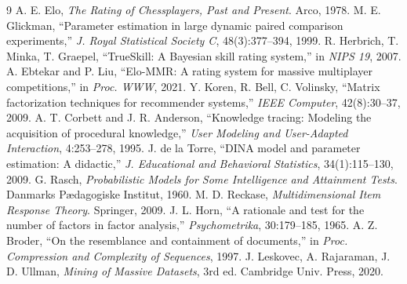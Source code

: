 \documentclass[conference]{IEEEtran}
\begin{document}
\begin{thebibliography}{9}
\scriptsize
\setlength{\itemsep}{0pt}
 A. E. Elo, \emph{The Rating of Chessplayers, Past and Present}. Arco, 1978.
 M. E. Glickman, ``Parameter estimation in large dynamic paired comparison experiments,'' \emph{J. Royal Statistical Society C}, 48(3):377--394, 1999.
 R. Herbrich, T. Minka, T. Graepel, ``TrueSkill: A Bayesian skill rating system,'' in \emph{NIPS 19}, 2007.
 A. Ebtekar and P. Liu, ``Elo-MMR: A rating system for massive multiplayer competitions,'' in \emph{Proc. WWW}, 2021.
 Y. Koren, R. Bell, C. Volinsky, ``Matrix factorization techniques for recommender systems,'' \emph{IEEE Computer}, 42(8):30--37, 2009.
 A. T. Corbett and J. R. Anderson, ``Knowledge tracing: Modeling the acquisition of procedural knowledge,'' \emph{User Modeling and User-Adapted Interaction}, 4:253--278, 1995.
 J. de la Torre, ``DINA model and parameter estimation: A didactic,'' \emph{J. Educational and Behavioral Statistics}, 34(1):115--130, 2009.
 G. Rasch, \emph{Probabilistic Models for Some Intelligence and Attainment Tests}. Danmarks P\ae dagogiske Institut, 1960.
 M. D. Reckase, \emph{Multidimensional Item Response Theory}. Springer, 2009.
 J. L. Horn, ``A rationale and test for the number of factors in factor analysis,'' \emph{Psychometrika}, 30:179--185, 1965.
 A. Z. Broder, ``On the resemblance and containment of documents,'' in \emph{Proc. Compression and Complexity of Sequences}, 1997.
 J. Leskovec, A. Rajaraman, J. D. Ullman, \emph{Mining of Massive Datasets}, 3rd ed. Cambridge Univ. Press, 2020.
\end{thebibliography}
\end{document}
